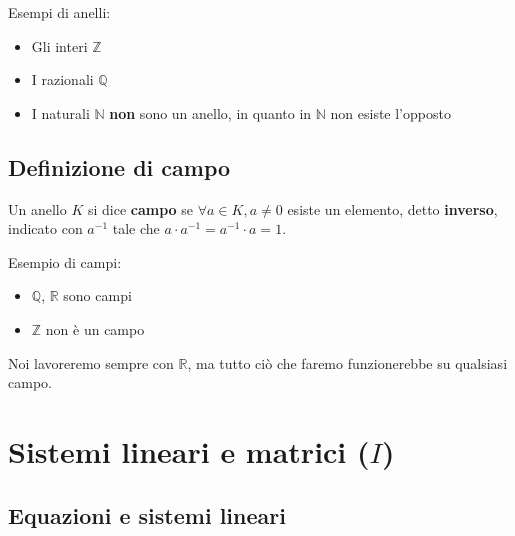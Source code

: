 \documentclass[
  a4paper,
]{article}
\providecommand{\tightlist}{%
  \setlength{\itemsep}{0pt}\setlength{\parskip}{0pt}}
\providecommand{\tightlist}{}
\begin{document}
\begin{examplebox}
Esempi di anelli:

\begin{itemize}
\tightlist
\item
  Gli interi \(\mathbb{Z}\)
\item
  I razionali \(\mathbb{Q}\)
\item
  I naturali \(\mathbb{N}\) \textbf{non} sono un anello, in quanto in
  \(\mathbb{N}\) non esiste l'opposto
\end{itemize}
\end{examplebox}

\hypertarget{definizione-di-campo}{%
\subsection{Definizione di campo}\label{definizione-di-campo}}

\begin{definitionbox}
Un anello \(K\) si dice \textbf{campo} se
\(\forall a \in K, a \not = 0\) esiste un elemento, detto
\textbf{inverso}, indicato con \(a^{-1}\) tale che
\(a \cdot a^{-1} = a^{-1} \cdot a = 1\).
\end{definitionbox}

\begin{examplebox}
Esempio di campi:

\begin{itemize}
\tightlist
\item
  \(\mathbb{Q}\), \(\mathbb{R}\) sono campi
\item
  \(\mathbb{Z}\) non è un campo
\end{itemize}
\end{examplebox}

\begin{notebox}
Noi lavoreremo sempre con \(\mathbb{R}\), ma tutto ciò che faremo
funzionerebbe su qualsiasi campo.
\end{notebox}

\newpage

\hypertarget{sistemi-lineari-e-matrici-i}{%
\section{\texorpdfstring{Sistemi lineari e matrici
(\(I\))}{Sistemi lineari e matrici (I)}}\label{sistemi-lineari-e-matrici-i}}

\hypertarget{equazioni-e-sistemi-lineari}{%
\subsection{Equazioni e sistemi
lineari}\label{equazioni-e-sistemi-lineari}}
\end{document}
